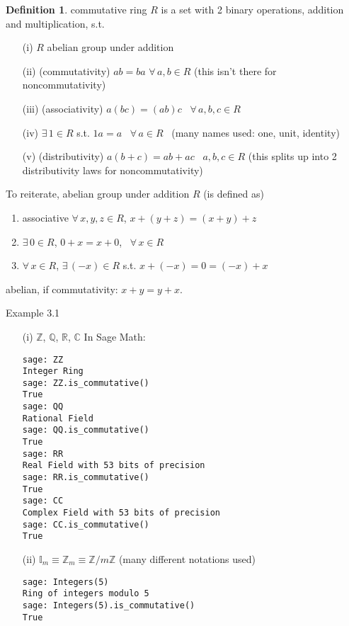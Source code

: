 \documentclass[twoside,landscape]{amsart}
\theoremstyle{plain}
\theoremstyle{definition}
\newtheorem{definition}{Definition}
\theoremstyle{remark}
\begin{document}
\begin{multicols*}{2}
\begin{definition} commutative ring $R$ is a set with 2 binary operations, addition and multiplication, s.t.
\begin{enumerate}
  \item[(i)] $R$ abelian group under addition 
  \item[(ii)] (commutativity) $ab=ba$ \quad $\forall \, a,b \in R$  (this isn't there for noncommutativity)
  \item[(iii)] (associativity) $a(bc) = (ab)c$ \quad \, $\forall \, a,b,c\in R$
  \item[(iv)] $\exists \, 1 \in R$ s.t. $1a = a$ \, $\forall \, a  \in R$ \quad \, (many names used: one, unit, identity)
  \item[(v)] (distributivity) $a(b+c) = ab+ac$ \quad \, $a,b,c \in R$ (this splits up into 2 distributivity laws for noncommutativity)
\end{enumerate}
\end{definition}

To reiterate, abelian group under addition $R$ (is defined as)
\begin{enumerate}
\item associative $\forall \, x , y ,z \in R$, $x + (y+z) = (x+y)+z$ 
\item $\exists \, 0 \in R$, $0+x = x + 0$, \, $\forall \, x \in R$ 
\item $\forall \, x \in R$, $\exists \, (-x) \in R$ s.t. $x+(-x) = 0 = (-x) + x$
  \end{enumerate}
abelian, if commutativity: $x+y=y+x$.  

Example 3.1 
\begin{enumerate}
\item[(i)] $\mathbb{Z}$, $\mathbb{Q}$, $\mathbb{R}$, $\mathbb{C}$
In Sage Math:

\begin{lstlisting}
sage: ZZ
Integer Ring
sage: ZZ.is_commutative()
True
sage: QQ
Rational Field
sage: QQ.is_commutative()
True
sage: RR
Real Field with 53 bits of precision
sage: RR.is_commutative()
True
sage: CC
Complex Field with 53 bits of precision
sage: CC.is_commutative()
True
\end{lstlisting}



\item[(ii)] $\mathbb{I}_m \equiv \mathbb{Z}_m \equiv \mathbb{Z}/m\mathbb{Z}$ (many different notations used)

\begin{lstlisting}
sage: Integers(5)
Ring of integers modulo 5
sage: Integers(5).is_commutative()
True
\end{lstlisting}


\end{enumerate}
\end{multicols*}
\end{document}
